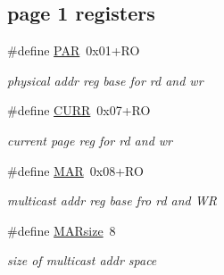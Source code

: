 \subsection*{page 1 registers}
\begin{DoxyCompactItemize}
\item 
\mbox{\label{group__gumstix__dp8390_ga214a9b541003b871f81961eab349761d}} 
\#define \mbox{\hyperlink{group__gumstix__dp8390_ga214a9b541003b871f81961eab349761d}{P\+AR}}~0x01+\+RO
\begin{DoxyCompactList}\small\item\em physical addr reg base for rd and wr \end{DoxyCompactList}\item 
\mbox{\label{group__gumstix__dp8390_ga8edd85b506b9cd04aa43de0b777964d1}} 
\#define \mbox{\hyperlink{group__gumstix__dp8390_ga8edd85b506b9cd04aa43de0b777964d1}{C\+U\+RR}}~0x07+\+RO
\begin{DoxyCompactList}\small\item\em current page reg for rd and wr \end{DoxyCompactList}\item 
\mbox{\label{group__gumstix__dp8390_ga8cf6c431bb390cdff475e7f849b1d62f}} 
\#define \mbox{\hyperlink{group__gumstix__dp8390_ga8cf6c431bb390cdff475e7f849b1d62f}{M\+AR}}~0x08+\+RO
\begin{DoxyCompactList}\small\item\em multicast addr reg base fro rd and WR \end{DoxyCompactList}\item 
\mbox{\label{group__gumstix__dp8390_gabae7a54e85c26c0723122ee40ca84d32}} 
\#define \mbox{\hyperlink{group__gumstix__dp8390_gabae7a54e85c26c0723122ee40ca84d32}{M\+A\+Rsize}}~8
\begin{DoxyCompactList}\small\item\em size of multicast addr space \end{DoxyCompactList}\end{DoxyCompactItemize}
